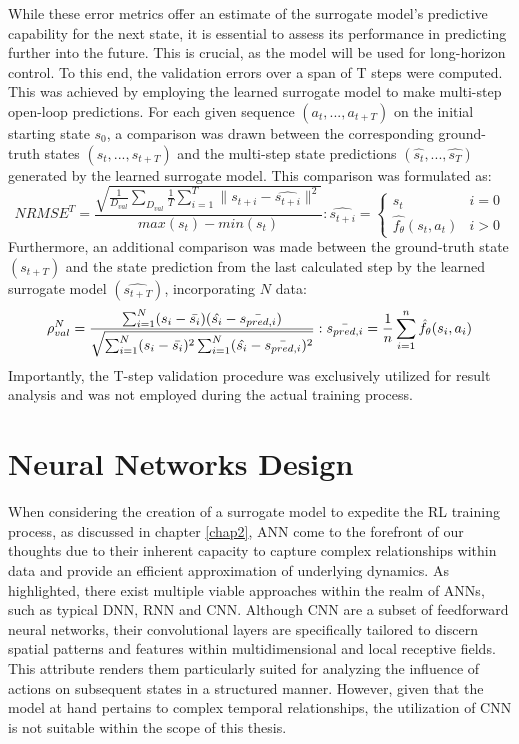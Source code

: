 While these error metrics offer an estimate of the surrogate model's predictive capability for the next state, it is essential to assess its performance in predicting further into the future. This is crucial, as the model will be used for long-horizon control. To this end, the validation errors over a span of T steps were computed. This was achieved by employing the learned surrogate model to make multi-step open-loop predictions. For each given sequence $(a_t, ..., a_{t+T})$ on the initial starting state $s_0$, a comparison was drawn between the corresponding ground-truth states $(s_t, ..., s_{t+T})$ and the multi-step state predictions $(\hat{s_t}, ..., \hat{s_{T}})$ generated by the learned surrogate model. This comparison was formulated as:
\begin{equation}
    NRMSE^{T} = \frac{\sqrt{\frac{1}{D_{val}}\sum_{D_{val}}\frac{1}{T}\sum_{i=1}^{T}\lVert s_{t+i}-\hat{s_{t+i}}\rVert^2}}{max(s_t) - min(s_t)} : 
    \hat{s_{t+i}} = \begin{cases} 
                        s_t & i=0 \\
                        \hat{f_\theta}(s_t, a_t) & i>0
                    \end{cases}
    \label{eq:NRMSET}
\end{equation}
Furthermore, an additional comparison was made between the ground-truth state $(s_{t+T})$ and the state prediction from the last calculated step by the learned surrogate model $(\hat{s_{t+T}})$, incorporating $N$ data:
\begin{equation}
    \rho_{val}^{N} = \frac{\sum_{i=1}^{N}(s_i - \Bar{s_i})(\hat{s_{i}}-\Bar{s_{pred,i}})}{\sqrt{\sum_{i=1}^{N}(s_i - \Bar{s_i})^2 \sum_{i=1}^{N}(\hat{s_{i}}-\Bar{s_{pred,i}})^2}} :
    \Bar{s_{pred,i}} = \frac{1}{n}\sum_{i=1}^{n}\hat{f_\theta}(s_i, a_i)
    \label{eq:R}
\end{equation}
Importantly, the T-step validation procedure was exclusively utilized for result analysis and was not employed during the actual training process.

\section{Neural Networks Design}
When considering the creation of a surrogate model to expedite the RL training process, as discussed in chapter \ref{chap2}, \ac{ANN} come to the forefront of our thoughts due to their inherent capacity to capture complex relationships within data and provide an efficient approximation of underlying dynamics. As highlighted, there exist multiple viable approaches within the realm of \ac{ANN}s, such as typical \ac{DNN}, \ac{RNN} and \ac{CNN}. Although \ac{CNN}  are a subset of feedforward neural networks, their convolutional layers are specifically tailored to discern spatial patterns and features within multidimensional and local receptive fields. This attribute renders them particularly suited for analyzing the influence of actions on subsequent states in a structured manner. However, given that the model at hand pertains to complex temporal relationships, the utilization of \ac{CNN} is not suitable within the scope of this thesis.

